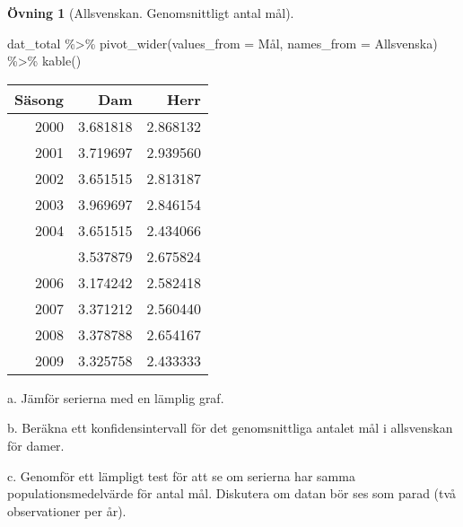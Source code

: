 \documentclass[
]{book}
\newenvironment{Shaded}{\begin{snugshade}}{\end{snugshade}}
\newcommand{\AttributeTok}[1]{\textcolor[rgb]{0.77,0.63,0.00}{#1}}
\newcommand{\FunctionTok}[1]{\textcolor[rgb]{0.00,0.00,0.00}{#1}}
\newcommand{\NormalTok}[1]{#1}
\newcommand{\SpecialCharTok}[1]{\textcolor[rgb]{0.00,0.00,0.00}{#1}}
\theoremstyle{definition}
\theoremstyle{definition}
\theoremstyle{definition}
\newtheorem{exercise}{Övning}[chapter]
\theoremstyle{definition}
\theoremstyle{remark}
\begin{document}
\begin{exercise}[Allsvenskan. Genomsnittligt antal mål]
\begin{Shaded}
\begin{Highlighting}[]
\NormalTok{dat\_total }\SpecialCharTok{\%\textgreater{}\%} 
  \FunctionTok{pivot\_wider}\NormalTok{(}\AttributeTok{values\_from =}\NormalTok{ Mål, }\AttributeTok{names\_from =}\NormalTok{ Allsvenska) }\SpecialCharTok{\%\textgreater{}\%} 
  \FunctionTok{kable}\NormalTok{()}
\end{Highlighting}
\end{Shaded}

\begin{table}
\centering
\begin{tabular}[t]{rrr}
\toprule
Säsong & Dam & Herr\\
\midrule
2000 & 3.681818 & 2.868132\\
2001 & 3.719697 & 2.939560\\
2002 & 3.651515 & 2.813187\\
2003 & 3.969697 & 2.846154\\
2004 & 3.651515 & 2.434066\\
\addlinespace
2005 & 3.537879 & 2.675824\\
2006 & 3.174242 & 2.582418\\
2007 & 3.371212 & 2.560440\\
2008 & 3.378788 & 2.654167\\
2009 & 3.325758 & 2.433333\\
\bottomrule
\end{tabular}
\end{table}

a. Jämför serierna med en lämplig graf.

b. Beräkna ett konfidensintervall för det genomsnittliga antalet mål i allsvenskan för damer.

c. Genomför ett lämpligt test för att se om serierna har samma populationsmedelvärde för antal mål. Diskutera om datan bör ses som parad (två observationer per år).
\end{exercise}
\end{document}
